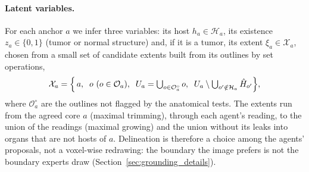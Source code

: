 \documentclass[fleqn,10pt]{olplainarticle}
\begin{document}
\paragraph{Latent variables.}
For each anchor $a$ we infer three variables: its host $h_a\in\mathcal{H}_a$, its existence $z_a\in\{0,1\}$ (tumor or
normal structure) and, if it is a tumor, its extent $\xi_a\in\mathcal{X}_a$, chosen from a small set of candidate extents
built from its outlines by set operations,
\begin{equation}
\label{eq:extents}
\mathcal{X}_a=\Bigl\{\,a,\;\;o\ (o\in\mathcal{O}_a),\;\;U_a=\textstyle\bigcup_{o\in\mathcal{O}^{\circ}_a}o,\;\;
U_a\setminus\bigcup_{o'\notin\mathcal{H}_a}\hat H_{o'}\Bigr\},
\end{equation}
where $\mathcal{O}^{\circ}_a$ are the outlines not flagged by the anatomical tests. The extents run from the agreed core
$a$ (maximal trimming), through each agent's reading, to the union of the readings (maximal growing) and the union
without its leaks into organs that are not hosts of $a$. Delineation is therefore a choice among the agents' proposals,
not a voxel-wise redrawing: the boundary the image prefers is not the boundary experts draw
(Section~\ref{sec:grounding_details}).
\end{document}
